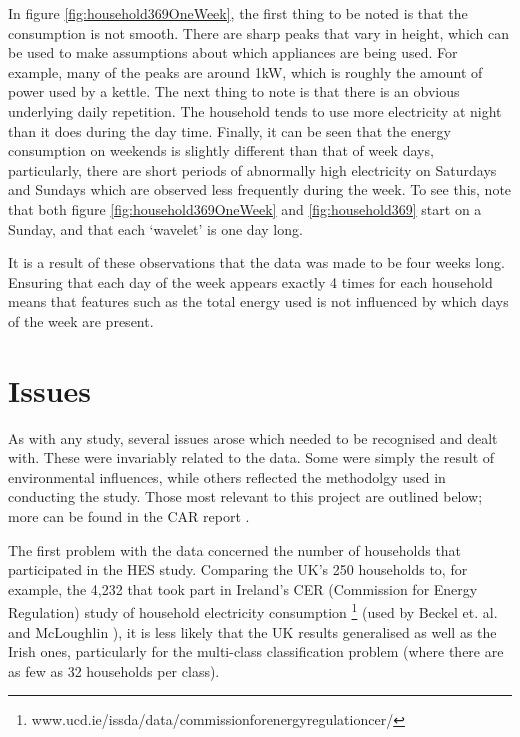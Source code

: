 In figure \ref{fig:household369OneWeek}, the first thing to be noted is that the consumption is not smooth. There are sharp peaks that vary in height, which can be used to make assumptions about which appliances are being used. For example, many of the peaks are around 1kW, which is roughly the amount of power used by a kettle. The next thing to note is that there is an obvious underlying daily repetition. The household tends to use more electricity at night than it does during the day time. Finally, it can be seen that the energy consumption on weekends is slightly different than that of week days, particularly, there are short periods of abnormally high electricity on Saturdays and Sundays which are observed less frequently during the week. To see this, note that both figure \ref{fig:household369OneWeek} and \ref{fig:household369} start on a Sunday, and that each `wavelet' is one day long.

It is a result of these observations that the data was made to be four weeks long. Ensuring that each day of the week appears exactly 4 times for each household means that features such as the total energy used is not influenced by which days of the week are present.

\householdOneWeek
\householdPlot




\section{Issues}

As with any study, several issues arose which needed to be recognised and dealt with.  These were invariably related to the data.  Some were simply the result of environmental influences, while others reflected the methodolgy used in conducting the study.  Those most relevant to this project are outlined below; more can be found in the CAR report \cite{early_findings}.

The first problem with the data concerned the number of households that participated in the HES study.  Comparing the UK's 250 households to, for example, the 4,232 that took part in Ireland's CER (Commission for Energy Regulation) study of household electricity consumption \footnote{www.ucd.ie/issda/data/commissionforenergyregulationcer/} (used by  Beckel et. al. and McLoughlin \cite{Beckel_1,Beckel_2,Beckel_3,McLoughlin}),  it is less likely that the UK results generalised as well as the Irish ones, particularly for the multi-class classification problem (where there are as few as 32 households per class). 

